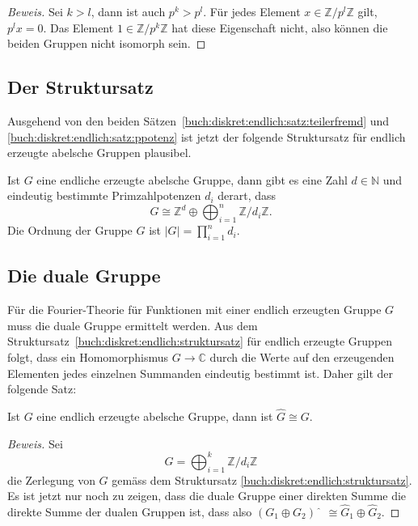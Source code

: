 \begin{proof}[Beweis]
Sei $k>l$, dann ist  auch $p^k>p^l$.
Für jedes Element $x \in \mathbb{Z}/p^l\mathbb{Z}$ gilt, 
$p^lx=0$.
Das Element $1\in \mathbb{Z}/p^k\mathbb{Z}$ hat diese Eigenschaft
nicht, also können die beiden Gruppen nicht isomorph sein.
\end{proof}

%
%
\subsection{Der Struktursatz
\label{buch:diskret:endlich:subsection:}}
Ausgehend von den beiden Sätzen~\ref{buch:diskret:endlich:satz:teilerfremd}
und
\ref{buch:diskret:endlich:satz:ppotenz}
ist jetzt der folgende Struktursatz für endlich erzeugte abelsche
Gruppen plausibel.

\begin{satz}
\label{buch:diskret:endlich:struktursatz}
%
Ist $G$ eine endliche erzeugte abelsche Gruppe, dann gibt es eine
Zahl $d\in\mathbb{N}$ und eindeutig bestimmte Primzahlpotenzen $d_i$
derart, dass
\[
G
\cong
\mathbb{Z}^d
\oplus
\bigoplus_{i=1}^n
\mathbb{Z}/d_i\mathbb{Z}.
\]
Die Ordnung der Gruppe $G$ ist $|G|=\prod_{i=1}^n d_i$.
%
\end{satz}

%
%
\subsection{Die duale Gruppe
\label{buch:diskret:endlich:subsection:dual}}
Für die Fourier-Theorie für Funktionen mit einer endlich erzeugten
Gruppe $G$ muss die duale Gruppe ermittelt werden.
Aus dem Struktursatz~\ref{buch:diskret:endlich:struktursatz}
für endlich erzeugte Gruppen folgt, dass ein Homomorphismus
$G\to\mathbb{C}$ durch die Werte auf den erzeugenden Elementen
jedes einzelnen Summanden eindeutig bestimmt ist.
Daher gilt der folgende Satz:

\begin{satz}
Ist $G$ eine endlich erzeugte abelsche Gruppe, dann ist
$\hat{G}\cong G$.
\end{satz}

\begin{proof}[Beweis]
Sei
\[
G
=
\bigoplus_{i=1}^k \mathbb{Z}/d_i\mathbb{Z}
\]
die Zerlegung von $G$ gemäss dem Struktursatz
\ref{buch:diskret:endlich:struktursatz}.
Es ist jetzt nur noch zu zeigen, dass die duale Gruppe einer direkten
Summe die direkte Summe der dualen Gruppen ist, dass also
$(G_1\oplus G_2)\hat{\phantom{\imath}} \cong \hat{G}_1\oplus \hat{G}_2$.
\end{proof}

